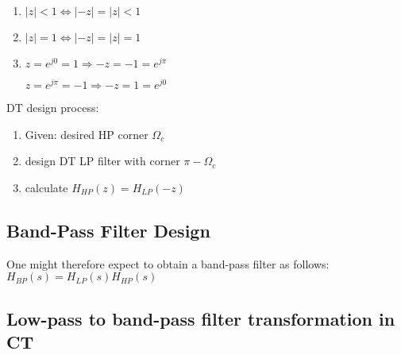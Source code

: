 \documentclass[8pt,a4paper]{scrartcl}
\begin{document}
\begin{multicols*}{3}

\begin{enumerate}
\ncompaq
\item $|z|<1\Leftrightarrow |-z|=|z|<1$
\item $|z|=1\Leftrightarrow |-z|=|z|=1$
\item $z=e^{j0}=1\Rightarrow -z=-1=e^{j\pi}$

$z=e^{j\pi}=-1\Rightarrow -z=1=e^{j0}$
\end{enumerate}


DT design process:
\begin{enumerate}
\ncompaq
\item Given: desired HP corner $\Omega_c$
\item design DT LP filter with corner $\pi-\Omega_c$
\item calculate $H_{HP}(z)=H_{LP}(-z)$
\end{enumerate}


\subsection{Band-Pass Filter Design}



One might therefore expect to obtain a band-pass filter as follows: $H_{BP}(s)=H_{LP}(s)H_{HP}(s)$





\subsection{Low-pass to band-pass filter transformation in CT}


\end{multicols*}
\end{document}
